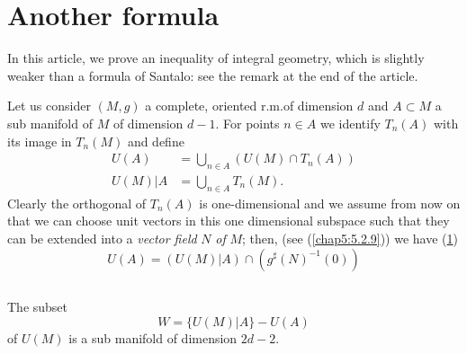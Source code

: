 \section{Another formula}\label{chap8:sec8}

In this article, we prove an inequality of integral geometry, which is
slightly weaker than a formula of Santalo: see the remark at the end
of the article.

Let us consider $(M,g)$ a complete, oriented r.m.\@ of dimension $d$
and $A\subset M$ a sub manifold of $M$ of dimension $d-1$. For points
$n\in A$ we identify $T_{n}(A)$ with its image in $T_{n}(M)$ and
define
\begin{align*}
U(A) &= \bigcup_{n\in A}(U(M)\cap T_{n}(A))\\
U(M)|A &= \bigcup_{n\in A}T_{n}(M).
\end{align*}
Clearly \pageoriginale the orthogonal of $T_{n}(A)$ is one-dimensional
and we assume from now on that we can choose unit vectors in this one
dimensional subspace such that they can be extended into a {\em vector
  field} $N$ {\em of} $M$; then, (see (\ref{chap5:5.2.9})) we have
(\ref{chap8:sec8})
\begin{equation*}
U(A)=(U(M)|A)\cap (g^{\sharp}(N)^{-1}(0))
\end{equation*}

\subsection{}\label{chap8:lem8.8.1}

\begin{lemma*}
The subset
$$
W=\{U(M)|A\}-U(A)
$$
of $U(M)$ is a sub manifold of dimension $2d-2$.
\end{lemma*}


